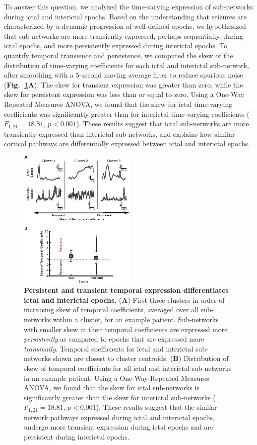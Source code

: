 To answer this question, we analyzed the time-varying expression of sub-networks during ictal and interictal epochs. Based on the understanding that seizures are characterized by a dynamic progression of well-defined epochs, we hypothesized that sub-networks are more transiently expressed, perhaps sequentially, during ictal epochs, and more persistently expressed during interictal epochs. To quantify temporal transience and persistence, we computed the skew of the distribution of time-varying coefficients for each ictal and interictal sub-network, after smoothing with a 5-second moving average filter to reduce spurious noise (\textbf{Fig.~\ref{ch4:fig5}A}). The skew for transient expression was greater than zero, while the skew for persistent expression was less than or equal to zero. Using a One-Way Repeated Measures ANOVA, we found that the skew for ictal time-varying coefficients was significantly greater than for interictal time-varying coefficients ($F_{1,21}=18.81$, $p<0.001$). These results suggest that ictal sub-networks are more transiently expressed than interictal sub-networks, and explains how similar cortical pathways are differentially expressed between ictal and interictal epochs.  

 \begin{figure}[H]
    \centering
    \includegraphics[width=0.5\textwidth]{panel5.eps}
    \caption[Persistent and transient temporal expression of functional sub-networks]{\textbf{Persistent and transient temporal expression differentiates ictal and interictal epochs.} (\textbf{A}) First three clusters in order of increasing skew of temporal coefficients, averaged over all sub-networks within a cluster, for an example patient. Sub-networks with smaller skew in their temporal coefficients are expressed more \textit{persistently} as compared to epochs that are expressed more \textit{transiently}. Temporal coefficients for ictal and interictal sub-networks shown are closest to cluster centroids. (\textbf{B}) Distribution of skew of temporal coefficients for all ictal and interictal sub-networks in an example patient. Using a One-Way Repeated Measures ANOVA, we found that the skew for ictal sub-networks is significantly greater than the skew for interictal sub-networks ($F_{1,21}=18.81$, $p<0.001$). These results suggest that the similar network pathways expressed during ictal and interictal epochs, undergo more transient expression during ictal epochs and are persistent during interictal epochs. \label{ch4:fig5}}
\end{figure}


